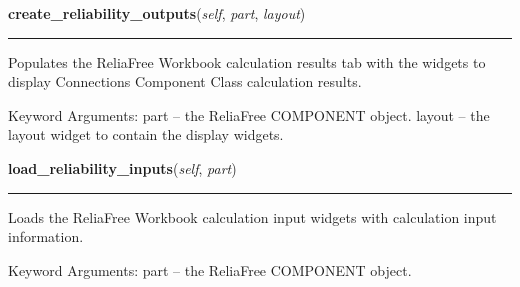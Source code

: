 \hspace{.8\funcindent}\begin{boxedminipage}{\funcwidth}

    \raggedright \textbf{create\_reliability\_outputs}(\textit{self}, \textit{part}, \textit{layout})

    \vspace{-1.5ex}

    \rule{\textwidth}{0.5\fboxrule}
\setlength{\parskip}{2ex}
    Populates the ReliaFree Workbook calculation results tab with the 
    widgets to display Connections Component Class calculation results.

    Keyword Arguments: part   -- the ReliaFree COMPONENT object. layout -- 
    the layout widget to contain the display widgets.

\setlength{\parskip}{1ex}
    \end{boxedminipage}

    \label{reliafree:connections:connection:Connection:load_reliability_inputs}

    \vspace{0.5ex}

\hspace{.8\funcindent}\begin{boxedminipage}{\funcwidth}

    \raggedright \textbf{load\_reliability\_inputs}(\textit{self}, \textit{part})

    \vspace{-1.5ex}

    \rule{\textwidth}{0.5\fboxrule}
\setlength{\parskip}{2ex}
    Loads the ReliaFree Workbook calculation input widgets with calculation
    input information.

    Keyword Arguments: part -- the ReliaFree COMPONENT object.

\setlength{\parskip}{1ex}
    \end{boxedminipage}

    \label{reliafree:connections:connection:Connection:load_reliability_outputs}

